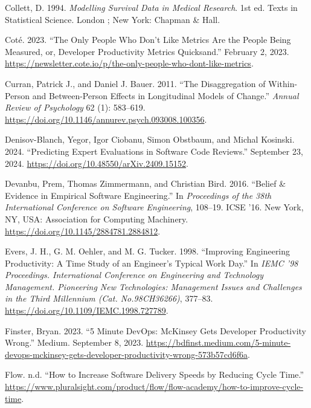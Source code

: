 \documentclass[
]{article}
\newlength{\cslhangindent}
\newenvironment{CSLReferences}[2] %
 {\begin{list}{}{%
  \setlength{\itemindent}{0pt}
  \setlength{\leftmargin}{0pt}
  \setlength{\parsep}{0pt}
  \ifodd #1
   \setlength{\leftmargin}{\cslhangindent}
   \setlength{\itemindent}{-1\cslhangindent}
  \fi
  \setlength{\itemsep}{#2\baselineskip}}}
 {\end{list}}
\begin{document}
\begin{CSLReferences}{1}{0}
Collett, D. 1994. \emph{Modelling Survival Data in Medical Research}.
1st ed. Texts in Statistical Science. London ; New York: Chapman \&
Hall.

Coté. 2023. {``The Only People Who Don't Like Metrics Are the People
Being Measured, or, Developer Productivity Metrics Quicksand.''}
February 2, 2023.
\url{https://newsletter.cote.io/p/the-only-people-who-dont-like-metrics}.

Curran, Patrick J., and Daniel J. Bauer. 2011. {``The {Disaggregation}
of {Within-Person} and {Between-Person Effects} in {Longitudinal Models}
of {Change}.''} \emph{Annual Review of Psychology} 62 (1): 583--619.
\url{https://doi.org/10.1146/annurev.psych.093008.100356}.

Denisov-Blanch, Yegor, Igor Ciobanu, Simon Obstbaum, and Michal
Kosinski. 2024. {``Predicting {Expert Evaluations} in {Software Code
Reviews}.''} September 23, 2024.
\url{https://doi.org/10.48550/arXiv.2409.15152}.

Devanbu, Prem, Thomas Zimmermann, and Christian Bird. 2016. {``Belief \&
Evidence in Empirical Software Engineering.''} In \emph{Proceedings of
the 38th {International Conference} on {Software Engineering}}, 108--19.
{ICSE} '16. New York, NY, USA: Association for Computing Machinery.
\url{https://doi.org/10.1145/2884781.2884812}.

Evers, J. H., G. M. Oehler, and M. G. Tucker. 1998. {``Improving
Engineering Productivity: A Time Study of an Engineer's Typical Work
Day.''} In \emph{{IEMC} '98 {Proceedings}. {International Conference} on
{Engineering} and {Technology Management}. {Pioneering New
Technologies}: {Management Issues} and {Challenges} in the {Third
Millennium} ({Cat}. {No}.{98CH36266})}, 377--83.
\url{https://doi.org/10.1109/IEMC.1998.727789}.

Finster, Bryan. 2023. {``5 {Minute DevOps}: {McKinsey Gets Developer
Productivity Wrong}.''} Medium. September 8, 2023.
\url{https://bdfinst.medium.com/5-minute-devops-mckinsey-gets-developer-productivity-wrong-573b57cd6f6a}.

Flow. n.d. {``How to Increase Software Delivery Speeds by Reducing Cycle
Time.''}
\url{https://www.pluralsight.com/product/flow/flow-academy/how-to-improve-cycle-time}.


\end{CSLReferences}
\end{document}
